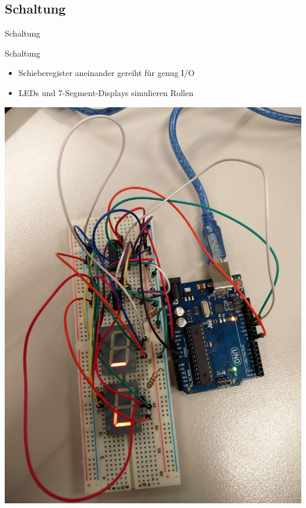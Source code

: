 \documentclass[mathserif,9pt]{beamer}
\begin{document}
    \subsection{Schaltung}
    \begin{frame}{Schaltung}
        \begin{block}{Schaltung}
            \begin{minipage}[c]{0.6\textwidth}
                \begin{itemize}
                    \item Schieberegister aneinander gereiht für genug I/O
                    \item LEDs und 7-Segment-Displays simulieren Rollen
                \end{itemize}
            \end{minipage}
            \hfill
            \begin{minipage}[c]{0.3\textwidth}
                \includegraphics[width=\textwidth]{img/breadboard.jpg}
            \end{minipage}
        \end{block}
    \end{frame}
\end{document}
